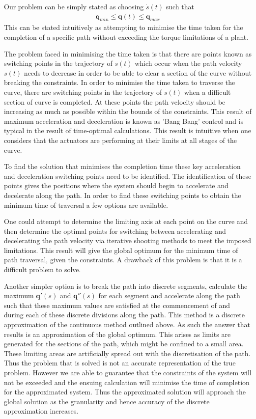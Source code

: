 Our problem can be simply stated as choosing $\dot{s}(t)$ such that 
\begin{align*}
\ddot{\textbf{q}}_{min} \leq \ddot{\textbf{q}}(t) \leq \ddot{\textbf{q}}_{max}
\end{align*} 
This can be stated intuitively as attempting to minimise the time taken for the completion of a specific path without exceeding the torque limitations of a plant.

The problem faced in minimising the time taken is that there are points known as switching points in the trajectory of $s(t)$ which occur when the path velocity $\dot{s}(t)$ needs to decrease in order to be able to clear a section of the curve without breaking the constraints. In order to minimise the time taken to traverse the curve, there are switching points in the trajectory of $s(t)$ when a difficult section of curve is completed. At these points the path velocity should be increasing as much as possible within the bounds of the constraints. This result of maximum acceleration and deceleration is known as 'Bang Bang' control and is typical in the result of time-optimal calculations. This result is intuitive when one considers that the actuators are performing at their limits at all stages of the curve.
 
To find the solution that minimises the completion time these key acceleration and deceleration switching points need to be identified. The identification of these points gives the positions where the system should begin to accelerate and decelerate along the path.
In order to find these switching points to obtain the minimum time of traversal a few options are available.

One could attempt to determine the limiting axis at each point on the curve and then determine the optimal points for switching between accelerating and decelerating the path velocity via iterative shooting methods to meet the imposed limitations. This result will give the global optimum for the minimum time of path traversal, given the constraints. A drawback of this problem is that it is a difficult problem to solve.

Another simpler option is to break the path into discrete segments, calculate the maximum $\textbf{q}'(s)$ and $\textbf{q}''(s)$ for each segment and accelerate along the path such that these maximum values are satisfied at the commencement of and during each of these discrete divisions along the path. This method is a discrete approximation of the continuous method outlined above. As such the answer that results is an approximation of the global optimum. This arises as limits are generated for the sections of the path, which might be confined to a small area. These limiting areas are artificially spread out with the discretisation of the path. Thus the problem that is solved is not an accurate representation of the true problem. However we are able to guarantee that the constraints of the system will not be exceeded and the ensuing calculation will minimise the time of completion for the approximated system. Thus the approximated solution will approach the global solution as the granularity and hence accuracy of the discrete approximation increases.


